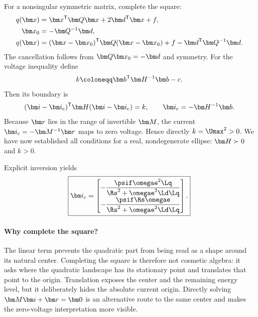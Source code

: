 For a nonsingular symmetric matrix, complete the square:
\begin{align}
q(\vect x)&=\vect x\trans\matr Q\vect x+2\vect d\trans\vect x+f,\\
\vect x_0&=-\matr Q\inv\vect d,\label{eq:center-general}\\
q(\vect x)&=(\vect x-\vect x_0)\trans\matr Q(\vect x-\vect x_0)
 +f-\vect d\trans\matr Q\inv\vect d.\label{eq:matrix-square}
\end{align}
The cancellation follows from $\matr Q\vect x_0=-\vect d$ and symmetry.  For
the voltage inequality define
\begin{equation}
 k\defeq\vect b\trans\Hpsm\inv\vect b-c.
\end{equation}
Then its boundary is
\begin{equation}
 (\current-\ic)\trans\Hpsm(\current-\ic)=k,
 \qquad \ic=-\Hpsm\inv\vect b.\label{eq:centered-voltage}
\end{equation}
Because $\vect r$ lies in the range of invertible $\Apsm$, the current
$\ic=-\Apsm\inv\vect r$ maps to zero voltage.  Hence directly $k=\Umax^2>0$.
We have now established all conditions for a real, nondegenerate ellipse:
$\Hpsm\succ0$ and $k>0$.

Explicit inversion yields
\begin{equation}
 \boxed{\ic=\begin{bmatrix}
 -\dfrac{\psif\omegae^2\Lq}{\Rs^2+\omegae^2\Ld\Lq}\\[.7em]
 -\dfrac{\psif\Rs\omegae}{\Rs^2+\omegae^2\Ld\Lq}
 \end{bmatrix}.}\label{eq:ellipse-center}
\end{equation}



\paragraph{Why complete the square?}
The linear term prevents the quadratic part from being read as a shape around
its natural center.  Completing the square is therefore not cosmetic algebra:
it asks where the quadratic landscape has its stationary point and translates
that point to the origin.  Translation exposes the center and the remaining
energy level, but it deliberately hides the absolute current origin.  Directly
solving $\Apsm\current+\vect r=\vect0$ is an alternative route to the same
center and makes the zero-voltage interpretation more visible.
